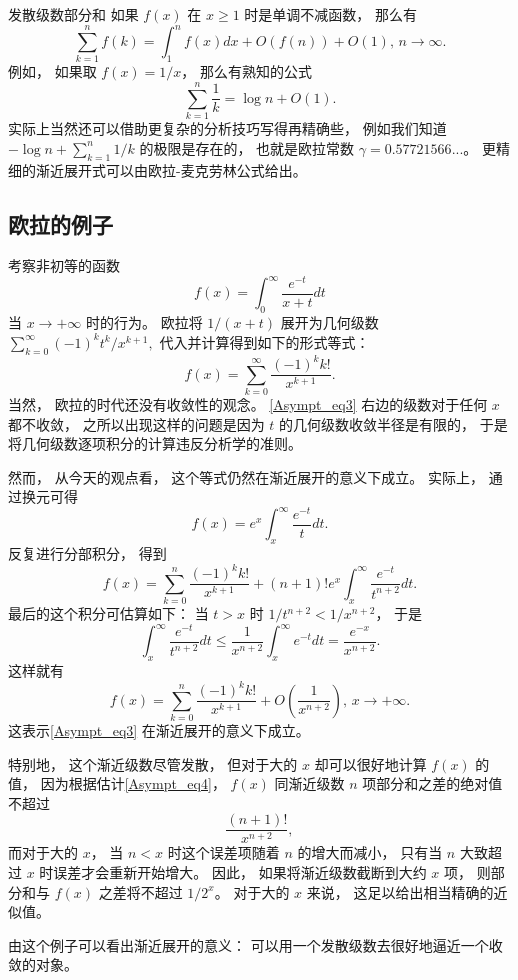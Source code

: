 \begin{example}{发散级数部分和}
如果 $f(x)$ 在 $x\geq1$ 时是单调不减函数， 那么有$$
\sum_{k=1}^nf(k)=\int_1^n f(x)dx+O(f(n))+O(1),\,n\to\infty.
$$
例如， 如果取 $f(x)=1/x$， 那么有熟知的公式
$$
\sum_{k=1}^n\frac{1}{k}=\log n+O(1).
$$
实际上当然还可以借助更复杂的分析技巧写得再精确些， 例如我们知道 $-\log n+\sum_{k=1}^n1/k$ 的极限是存在的， 也就是欧拉常数 $\gamma=0.57721566...$。 更精细的渐近展开式可以由欧拉-麦克劳林公式给出。
\end{example}

\subsection{欧拉的例子}
考察非初等的函数
$$
f(x)=\int_0^\infty\frac{e^{-t}}{x+t}dt
$$
当 $x\to+\infty$ 时的行为。 欧拉将 $1/(x+t)$ 展开为几何级数
$
\sum_{k=0}^\infty {(-1)^kt^k}/{x^{k+1}},
$
代入并计算得到如下的形式等式：
\begin{equation}\label{Asympt_eq3}
f(x)=\sum_{k=0}^\infty\frac{(-1)^kk!}{x^{k+1}}.
\end{equation}
当然， 欧拉的时代还没有收敛性的观念。 \autoref{Asympt_eq3} 右边的级数对于任何 $x$ 都不收敛， 之所以出现这样的问题是因为 $t$ 的几何级数收敛半径是有限的， 于是将几何级数逐项积分的计算违反分析学的准则。 

然而， 从今天的观点看， 这个等式仍然在渐近展开的意义下成立。 实际上， 通过换元可得
$$
f(x)=e^{x}\int_x^\infty \frac{e^{-t}}{t}dt.
$$
反复进行分部积分， 得到
$$
f(x)=\sum_{k=0}^n\frac{(-1)^kk!}{x^{k+1}}
+(n+1)!e^x\int_x^\infty\frac{e^{-t}}{t^{n+2}}dt.
$$
最后的这个积分可估算如下： 当 $t>x$ 时 $1/t^{n+2}<1/x^{n+2}$， 于是
\begin{equation}\label{Asympt_eq4}
\int_x^\infty\frac{e^{-t}}{t^{n+2}}dt
\leq\frac{1}{x^{n+2}}\int_x^\infty e^{-t}dt
=\frac{e^{-x}}{x^{n+2}}.
\end{equation}
这样就有
$$
f(x)=\sum_{k=0}^n\frac{(-1)^kk!}{x^{k+1}}
+O\left(\frac{1}{x^{n+2}}\right),\,x\to+\infty.
$$
这表示\autoref{Asympt_eq3} 在渐近展开的意义下成立。 

特别地， 这个渐近级数尽管发散， 但对于大的 $x$ 却可以很好地计算 $f(x)$ 的值， 因为根据估计\autoref{Asympt_eq4}， $f(x)$ 同渐近级数 $n$ 项部分和之差的绝对值不超过
$$
\frac{(n+1)!}{x^{n+2}},
$$
而对于大的 $x$， 当 $n<x$ 时这个误差项随着 $n$ 的增大而减小， 只有当 $n$ 大致超过 $x$ 时误差才会重新开始增大。 因此， 如果将渐近级数截断到大约 $x$ 项， 则部分和与 $f(x)$ 之差将不超过 $1/2^x$。 对于大的 $x$ 来说， 这足以给出相当精确的近似值。 

由这个例子可以看出渐近展开的意义： 可以用一个发散级数去很好地逼近一个收敛的对象。